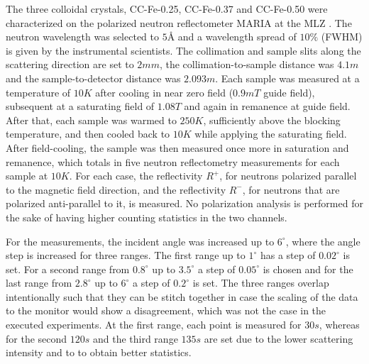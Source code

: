 \documentclass[\main/dresen_thesis.tex]{subfiles}
\begin{document}
    The three colloidal crystals, CC-Fe-0.25, CC-Fe-0.37 and CC-Fe-0.50 were characterized on the polarized neutron reflectometer MARIA at the MLZ .
    The neutron wavelength was selected to $5 \unit{\angstrom}$ and a wavelength spread of $10 \unit{\%}$ (FWHM) is given by the instrumental scientists.
    The collimation and sample slits along the scattering direction are set to $2 \unit{mm}$, the collimation-to-sample distance was $4.1 \unit{m}$ and the sample-to-detector distance was $2.093 \unit{m}$.
    Each sample was measured at a temperature of $10 \unit{K}$ after cooling in near zero field ($0.9 \unit{mT}$ guide field), subsequent at a saturating field of $1.08 \unit{T}$ and again in remanence at guide field.
    After that, each sample was warmed to $250 \unit{K}$, sufficiently above the blocking temperature, and then cooled back to $10 \unit{K}$ while applying the saturating field.
    After field-cooling, the sample was then measured once more in saturation and remanence, which totals in five neutron reflectometry measurements for each sample at $10 \unit{K}$.
    For each case, the reflectivity $R^{+}$, for neutrons polarized parallel to the magnetic field direction, and the reflectivity $R^{-}$, for neutrons that are polarized anti-parallel to it, is measured.
    No polarization analysis is performed for the sake of having higher counting statistics in the two channels.

    For the measurements, the incident angle was increased up to $6 ^\circ$, where the angle step is increased for three ranges.
    The first range up to $1 ^\circ$ has a step of $0.02 ^\circ$ is set.
    For a second range from $0.8 ^\circ$ up to $3.5 ^\circ$ a step of $0.05 ^\circ$ is chosen and for the last range from $2.8 ^\circ$ up to $6 ^\circ$ a step of $0.2 ^\circ$ is set.
    The three ranges overlap intentionally such that they can be stitch together in case the scaling of the data to the monitor would show a disagreement, which was not the case in the executed experiments.
    At the first range, each point is measured for $30 \unit{s}$, whereas for the second $120 \unit{s}$ and the third range $135 \unit{s}$ are set due to the lower scattering intensity and to to obtain better statistics.
\end{document}
